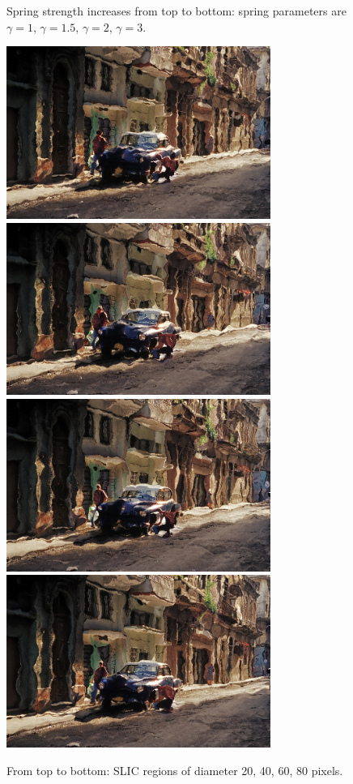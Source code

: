 \begin{figure}[htbp]
\caption{Spring strength increases from top to bottom: spring parameters are
$\gamma=1$, $\gamma=1.5$, $\gamma=2$, $\gamma=3$.}
\label{fig:spring}
\end{figure}


\begin{figure}[htbp] \centering
\includegraphics[width=3.4in]{images/street-20.jpg}
\includegraphics[width=3.4in]{images/street-40.jpg}
\includegraphics[width=3.4in]{images/street-60.jpg}
\includegraphics[width=3.4in]{images/street-80.jpg}
\caption{From top to bottom: SLIC regions of diameter 20, 40, 60, 80 pixels.}
\label{fig:slic}
\end{figure}

